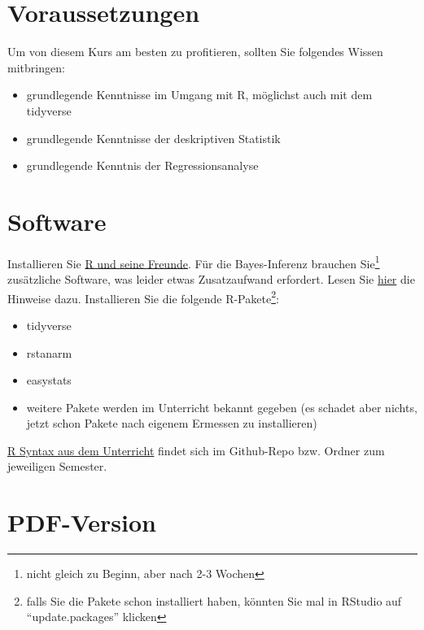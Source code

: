 \documentclass[
  a4paper,
  DIV=11]{scrreprt}
\providecommand{\tightlist}{%
  \setlength{\itemsep}{0pt}\setlength{\parskip}{0pt}}\usepackage{longtable,booktabs,array}
\theoremstyle{definition}
\theoremstyle{remark}
\begin{document}
\hypertarget{voraussetzungen}{%
\section*{Voraussetzungen}\label{voraussetzungen}}

Um von diesem Kurs am besten zu profitieren, sollten Sie folgendes
Wissen mitbringen:

\begin{itemize}
\tightlist
\item
  grundlegende Kenntnisse im Umgang mit R, möglichst auch mit dem
  tidyverse
\item
  grundlegende Kenntnisse der deskriptiven Statistik
\item
  grundlegende Kenntnis der Regressionsanalyse
\end{itemize}

\hypertarget{software}{%
\section*{Software}\label{software}}

Installieren Sie
\href{https://data-se.netlify.app/2021/11/30/installation-von-r-und-seiner-freunde/}{R
und seine Freunde}. Für die Bayes-Inferenz brauchen Sie\footnote{nicht
  gleich zu Beginn, aber nach 2-3 Wochen} zusätzliche Software, was
leider etwas Zusatzaufwand erfordert. Lesen Sie
\href{https://data-se.netlify.app/2022/01/28/bayes-software-installieren-f\%C3\%BCr-r/}{hier}
die Hinweise dazu. Installieren Sie die folgende R-Pakete\footnote{falls
  Sie die Pakete schon installiert haben, könnten Sie mal in RStudio auf
  ``update.packages'' klicken}:

\begin{itemize}
\tightlist
\item
  tidyverse
\item
  rstanarm
\item
  easystats
\item
  weitere Pakete werden im Unterricht bekannt gegeben (es schadet aber
  nichts, jetzt schon Pakete nach eigenem Ermessen zu installieren)
\end{itemize}

\href{https://github.com/sebastiansauer/Lehre}{R Syntax aus dem
Unterricht} findet sich im Github-Repo bzw. Ordner zum jeweiligen
Semester.

\hypertarget{pdf-version}{%
\section*{PDF-Version}\label{pdf-version}}
\end{document}
